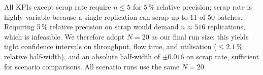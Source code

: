 All KPIs except scrap rate require $n \le 5$ for 5\,\% relative precision;
scrap rate is highly variable because a single replication can scrap up to 11
of 50 batches. Requiring 5\,\% relative precision on scrap would demand
$n \approx 516$ replications, which is infeasible. We therefore adopt
$N = 20$ as our final run size: this yields tight confidence intervals on
throughput, flow time, and utilisation ($\le 2.1\,\%$ relative half-width),
and an absolute half-width of $\pm 0.016$ on scrap rate, sufficient for
scenario comparisons. All scenario runs use the same $N = 20$.

